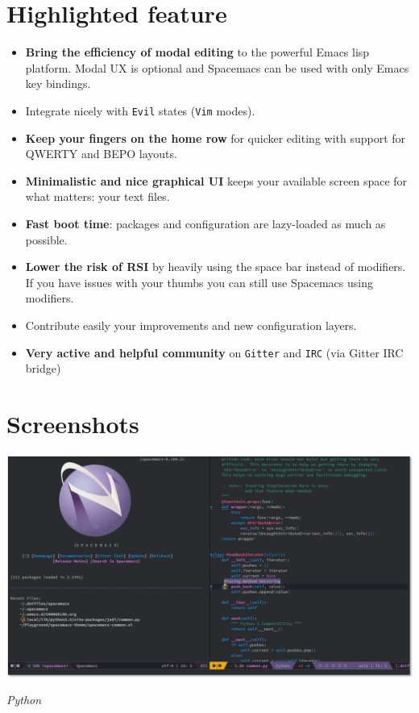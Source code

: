 \documentclass[11pt]{article}
\begin{document}
\section{Highlighted feature}
\label{sec:org7d7c6bd}
\begin{itemize}
\item \textbf{Bring the efficiency of modal editing} to the powerful Emacs lisp platform.
Modal UX is optional and Spacemacs can be used with only Emacs key bindings.

\item Integrate nicely with \texttt{Evil} states (\texttt{Vim} modes).

\item \textbf{Keep your fingers on the home row} for quicker editing with support for
QWERTY and BEPO layouts.

\item \textbf{Minimalistic and nice graphical UI} keeps your available screen space for
what matters: your text files.

\item \textbf{Fast boot time}: packages and configuration are lazy-loaded as much as
possible.

\item \textbf{Lower the risk of RSI} by heavily using the space bar instead of modifiers.
If you have issues with your thumbs you can still use Spacemacs using
modifiers.

\item Contribute easily your improvements and new configuration layers.

\item \textbf{Very active and helpful community} on \texttt{Gitter} and \texttt{IRC}
(via Gitter IRC bridge)
\end{itemize}

\section{Screenshots}
\label{sec:orgda076db}

\begin{center}
\includegraphics[width=.9\linewidth]{img/spacemacs-python.png}
\end{center}
\emph{Python}
\end{document}
